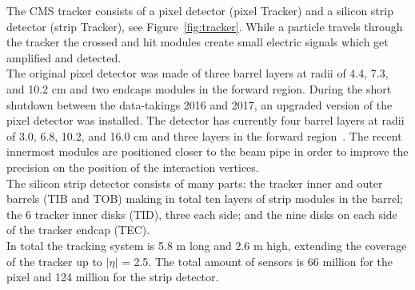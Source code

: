 The CMS tracker consists of a pixel detector (pixel Tracker) and a
silicon strip detector (strip Tracker), see
Figure~\ref{fig:tracker}. While a particle travels through the tracker
the crossed and hit modules create small electric signals which get amplified and
detected.\\
The original pixel detector was made of three barrel
layers at radii of 4.4, 7.3, and 10.2 cm and two endcaps modules in
the forward region. 
During the short shutdown between the data-takings 2016 and 2017, 
an
upgraded version of the pixel detector was installed. The detector has currently four
barrel layers at radii of 3.0, 6.8, 10.2, and
16.0 cm and three layers in the forward region~\cite{Dominguez:1481838}. The
recent innermost modules
are positioned closer to the beam pipe in order to improve the
precision on the position of the interaction vertices.\\
The silicon strip detector consists of many parts: the tracker inner and
outer barrels (TIB and TOB) making in total ten layers of strip modules in
the barrel; the 6 tracker inner disks (TID), three each
side; and the nine disks on each side of the tracker endcap (TEC).\\
In total the tracking system is 5.8 m long and 2.6 m high,
extending the coverage of the tracker up to $|\eta|$ = 2.5. The total
amount of sensors is 66 million for the pixel and 124 million for the
strip detector. 

